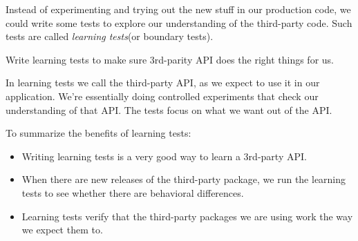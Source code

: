 Instead of experimenting and trying out the new stuff in our production code, we could write some tests to explore our understanding of the third-party code. Such tests are called \textit{learning tests}(or boundary tests).

\begin{marker}
Write learning tests to make sure 3rd-parity API does the right things for us. 
\end{marker}

In learning tests we call the third-party API, as we expect to use it in our application. We're essentially doing controlled experiments that check our understanding of that API. The tests focus on what we want out of the API.

To summarize the benefits of learning tests:

\begin{itemize}
    \item Writing learning tests is a very good way to learn a 3rd-party API.
    \item When there are new releases of the third-party package, we run the learning tests to see whether there are behavioral differences.
    \item Learning tests verify that the third-party packages we are using work the way we expect them to.
\end{itemize}


